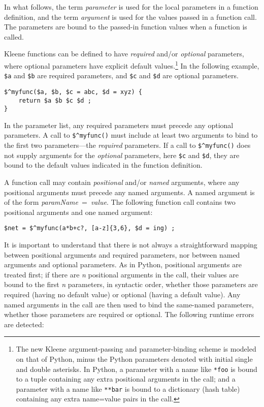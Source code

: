 In what follows, the term \emph{parameter} is used for the local
parameters in a function definition, and the term \emph{argument} is
used for the values passed in a function call.  The parameters are bound to the passed-in 
function values when a function
is called.

Kleene functions can be defined to have \emph{required} and/or \emph{optional}
parameters, where optional parameters have explicit default
values.\cprotect\footnote{The new Kleene argument-passing and parameter-binding scheme
is modeled on that of Python, minus the Python parameters denoted with
initial single and double asterisks.  In Python, a parameter with a name like
\verb!*foo! is bound to a tuple containing any extra positional arguments in
the call; and
a parameter with a name like \verb!**bar! is bound to a dictionary (hash table) containing any
extra name=value pairs in the call.} In
the following example, \verb!$a! and \verb!$b! are required parameters, and \verb!$c! and
\verb!$d! are optional parameters.

\begin{Verbatim}
$^myfunc($a, $b, $c = abc, $d = xyz) {
	return $a $b $c $d ;
}
\end{Verbatim}

\noindent
In the parameter list, any required parameters must precede any optional parameters.
A call to \verb!$^myfunc()! must include at least two arguments to bind to
the first two parameters---the \emph{required} parameters.
If a call to \verb!$^myfunc()! does not supply arguments for the \emph{optional}
parameters, here \verb!$c! and \verb!$d!, they are bound to the default values indicated
in the function definition.

A function call may contain \emph{positional} and/or \emph{named}
arguments, where any positional arguments must precede any named arguments.  A
named argument is of the form \emph{paramName}~=~\emph{value}.
The following function call contains two positional arguments and one named
argument:

\begin{Verbatim}
$net = $^myfunc(a*b+c?, [a-z]{3,6}, $d = ing) ;
\end{Verbatim}

\noindent
It is important to understand that there is not always a straightforward mapping
between positional arguments and required parameters, nor between named
arguments and optional parameters.  As in Python, positional arguments
are treated first; if there are \emph{n} positional arguments in the
call, their
values are bound to the first \emph{n} parameters, in syntactic order,
whether those
parameters are required (having no default value) or optional (having a
default value).  Any named arguments in the call are then used
to bind the same-named parameters, whether those parameters are
required or optional.  The following runtime errors are detected:

